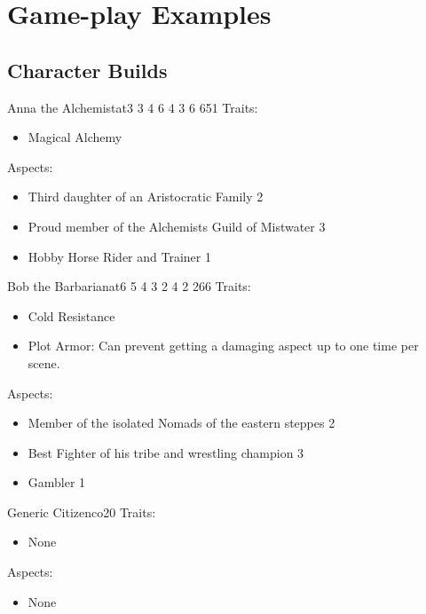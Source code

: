 \documentclass[11pt]{article}
\begin{document}
{\section{Game-play Examples}
\label{sec:orgf449525}
\subsection{Character Builds}
\label{sec:orgbeb881b}

\begin{npc}{Anna the Alchemist}{at}{3 3 4 6 4 3 6 6}{51}
Traits:
\begin{itemize}
\item Magical Alchemy
\end{itemize}
\columnbreak
Aspects:
\begin{itemize}
\item Third daughter of an Aristocratic Family 2
\item Proud member of the Alchemists Guild of Mistwater 3
\item Hobby Horse Rider and Trainer 1
\end{itemize}
\end{npc}

\begin{npc}{Bob the Barbarian}{at}{6 5 4 3 2 4 2 2}{66}
Traits:
\begin{itemize}
\item Cold Resistance
\item Plot Armor: Can prevent getting a damaging aspect up to one time per scene.
\end{itemize}
\columnbreak

Aspects:
\begin{itemize}
\item Member of the isolated Nomads of the eastern steppes 2
\item Best Fighter of his tribe and wrestling champion 3
\item Gambler 1
\end{itemize}
\end{npc}

\begin{npc}{Generic Citizen}{co}{2}{0}
Traits:
\begin{itemize}
\item None
\end{itemize}

\columnbreak

Aspects:
\begin{itemize}
\item None
\end{itemize}
\end{npc}

}
\end{document}
